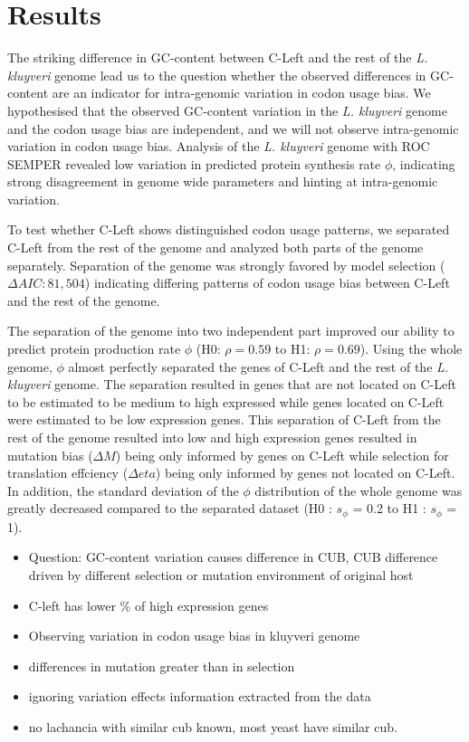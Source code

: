 \documentclass[12pt,draft]{article}
\begin{document}
	
\section*{Results}
The striking difference in GC-content between C-Left and the rest of the \textit{L. kluyveri} genome lead us to the question whether the observed differences in GC-content are an indicator for intra-genomic variation in codon usage bias.
We hypothesised that the observed GC-content variation in the \textit{L. kluyveri} genome and the codon usage bias are independent, and we will not observe intra-genomic variation in codon usage bias.
Analysis of the \textit{L. kluyveri} genome with ROC SEMPER revealed low variation in predicted protein synthesis rate $\phi$, indicating strong disagreement in genome wide parameters and hinting at intra-genomic variation.
 
To test whether C-Left shows distinguished codon usage patterns, we separated C-Left from the rest of the genome and analyzed both parts of the genome separately.
Separation of the genome was strongly favored by model selection ($\Delta AIC: 81,504$) indicating differing patterns of codon usage bias between C-Left and the rest of the genome.

The separation of the genome into two independent part improved our ability to predict protein production rate $\phi$ (H0: $\rho = 0.59$ to H1: $\rho = 0.69$).
Using the whole genome, $\phi$ almost perfectly separated the genes of C-Left and the rest of the \textit{L. kluyveri} genome. 
The separation resulted in genes that are not located on C-Left to be estimated to be medium to high expressed while genes located on C-Left were estimated to be low expression genes. 
This separation of C-Left from the rest of the genome resulted into low and high expression genes resulted in mutation bias ($\Delta M$) being only informed by genes on C-Left while selection for translation effciency ($\Delta eta$) being only informed by genes not located on C-Left. 
In addition, the standard deviation of the $\phi$ distribution of the whole genome was greatly decreased compared to the separated dataset (H0 : $s_{\phi}$ = 0.2 to H1 : $s_{\phi}$ = 1).

\begin{itemize}
	\item Question: GC-content variation causes difference in CUB, CUB difference driven by different selection or mutation environment of original host
	\item C-left has lower \% of high expression genes
	\item Observing variation in codon usage bias in kluyveri genome
	\item differences in mutation greater than in selection
	\item ignoring variation effects information extracted from the data
	\item no lachancia with similar cub known, most yeast have similar cub.
\end{itemize}
\end{document}
